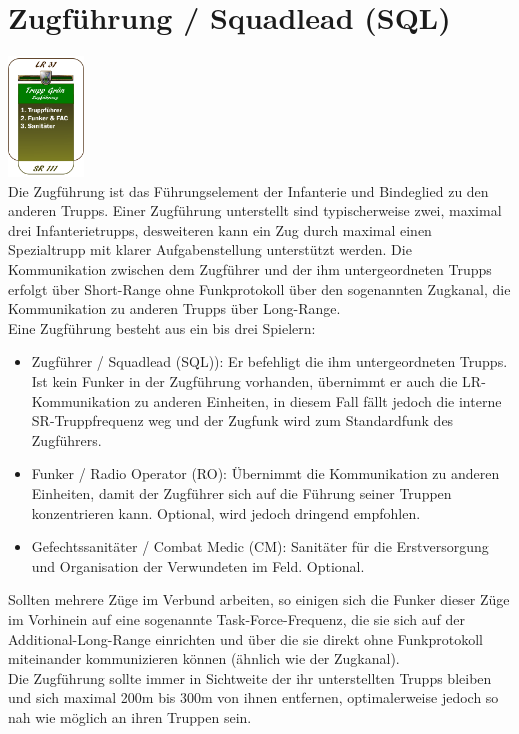 \section{Zugführung / Squadlead (SQL)}
\includegraphics[width=20mm]{./img/truppenordnung/zugfuehrung/zugfuehrung.png}\\
Die Zugführung ist das Führungselement der Infanterie und Bindeglied zu den anderen Trupps. Einer Zugführung unterstellt sind typischerweise zwei, maximal drei Infanterietrupps, desweiteren kann ein Zug durch maximal einen Spezialtrupp mit klarer Aufgabenstellung unterstützt werden. Die Kommunikation zwischen dem Zugführer und der ihm untergeordneten Trupps erfolgt über Short-Range ohne Funkprotokoll über den sogenannten Zugkanal, die Kommunikation zu anderen Trupps über Long-Range.\\
Eine Zugführung besteht aus ein bis drei Spielern:
\begin{itemize}
	\item Zugführer / Squadlead (SQL)): Er befehligt die ihm untergeordneten Trupps. Ist kein Funker in der Zugführung vorhanden, übernimmt er auch die LR-Kommunikation zu anderen Einheiten, in diesem Fall fällt jedoch die interne SR-Truppfrequenz weg und der Zugfunk wird zum Standardfunk des Zugführers.
	\item Funker / Radio Operator (RO): Übernimmt die Kommunikation zu anderen Einheiten, damit der Zugführer sich auf die Führung seiner Truppen konzentrieren kann. Optional, wird jedoch dringend empfohlen.
	\item Gefechtssanitäter / Combat Medic (CM): Sanitäter für die Erstversorgung und Organisation der Verwundeten im Feld. Optional.
\end{itemize}
Sollten mehrere Züge im Verbund arbeiten, so einigen sich die Funker dieser Züge im Vorhinein auf eine sogenannte Task-Force-Frequenz, die sie sich auf der Additional-Long-Range einrichten und über die sie direkt ohne Funkprotokoll miteinander kommunizieren können (ähnlich wie der Zugkanal).\\
Die Zugführung sollte immer in Sichtweite der ihr unterstellten Trupps bleiben und sich maximal 200m bis 300m von ihnen entfernen, optimalerweise jedoch so nah wie möglich an ihren Truppen sein.